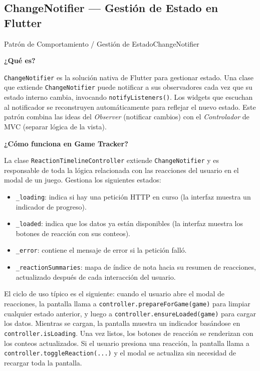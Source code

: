 \subsection{ChangeNotifier — Gestión de Estado en Flutter}

\begin{patternbox}{Patrón de Comportamiento / Gestión de Estado}{ChangeNotifier}

\textbf{¿Qué es?}

\texttt{ChangeNotifier} es la solución nativa de Flutter para gestionar estado.
Una clase que extiende \texttt{ChangeNotifier} puede notificar a sus
observadores cada vez que su estado interno cambia, invocando
\texttt{notifyListeners()}. Los widgets que escuchan al notificador se
reconstruyen automáticamente para reflejar el nuevo estado. Este patrón
combina las ideas del \textit{Observer} (notificar cambios) con el
\textit{Controlador} de MVC (separar lógica de la vista).

\vspace{0.5em}
\textbf{¿Cómo funciona en Game Tracker?}

La clase \texttt{ReactionTimelineController} extiende \texttt{ChangeNotifier}
y es responsable de toda la lógica relacionada con las reacciones del usuario
en el modal de un juego. Gestiona los siguientes estados:

\begin{itemize}
    \item \texttt{\_loading}: indica si hay una petición HTTP en curso
    (la interfaz muestra un indicador de progreso).
    \item \texttt{\_loaded}: indica que los datos ya están disponibles
    (la interfaz muestra los botones de reacción con sus conteos).
    \item \texttt{\_error}: contiene el mensaje de error si la petición falló.
    \item \texttt{\_reactionSummaries}: mapa de índice de nota hacia su resumen
    de reacciones, actualizado después de cada interacción del usuario.
\end{itemize}

El ciclo de uso típico es el siguiente: cuando el usuario abre el modal de
reacciones, la pantalla llama a \texttt{controller.prepareForGame(game)} para
limpiar cualquier estado anterior, y luego a \texttt{controller.ensureLoaded(game)}
para cargar los datos. Mientras se cargan, la pantalla muestra un indicador
basándose en \texttt{controller.isLoading}. Una vez listos, los botones de
reacción se renderizan con los conteos actualizados. Si el usuario presiona una
reacción, la pantalla llama a \texttt{controller.toggleReaction(...)} y el modal
se actualiza sin necesidad de recargar toda la pantalla.


\end{patternbox}
